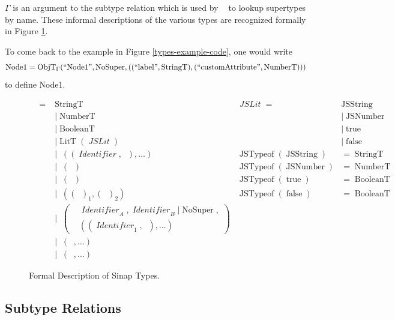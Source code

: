 \documentclass[12pt]{article}
\DeclareMathOperator{\StringT}{StringT}
\DeclareMathOperator{\NumberT}{NumberT}
\DeclareMathOperator{\BooleanT}{BooleanT}
\DeclareMathOperator{\LitT}{LitT}
\DeclareMathOperator{\JSLit}{\textit{JSLit}}
\DeclareMathOperator{\JSTypeof}{JSTypeof}
\DeclareMathOperator{\RecT}{RecT_\Gamma}
\DeclareMathOperator{\ObjT}{ObjT_\Gamma}
\DeclareMathOperator{\ListT}{ListT_\Gamma}
\DeclareMathOperator{\SetT}{SetT_\Gamma}
\DeclareMathOperator{\MapT}{MapT_\Gamma}
\DeclareMathOperator{\UnionT}{UnionT_\Gamma}
\DeclareMathOperator{\InterT}{InterT_\Gamma}
\DeclareMathOperator{\Identifier}{\textit{Identifier}}
\DeclareMathOperator{\Type}{{\textit{Type}_\Gamma}}
\DeclareMathOperator{\NoSuper}{NoSuper}
\DeclareMathOperator{\ObjectSubtype}{ObjectSubtype_\Gamma}
\begin{document}
\(\Gamma\) is an 
argument to the subtype relation which is used by \(\ObjectSubtype\) to 
lookup supertypes by name. These informal 
descriptions of the various types are recognized formally 
in Figure \ref{sinap-types-model}.

To come back to the example in Figure \ref{types-example-code}, 
one would write 
\[
    \operatorname{Node1} = \ObjT(``\text{Node1}", \NoSuper, (
        (``\text{label}", \StringT),
        (``\text{customAttribute}", \NumberT)
        ))
\]
to define Node1.

\linespread{1}
\begin{figure}
\begin{mdframed}
\begin{align*}
\Type = &\StringT   &\JSLit = &\operatorname{JSString} \\
&|\NumberT                 &&| \operatorname{JSNumber} \\
&|\BooleanT                &&| \operatorname{true} \\
&|\LitT(\JSLit)            &&| \operatorname{false} \\
&|\RecT((\Identifier, \Type), ...) & \JSTypeof(\operatorname{JSString}) &= \StringT \\
&|\ListT(\Type) & \JSTypeof(\operatorname{JSNumber}) &= \NumberT \\
&|\SetT(\Type) & \JSTypeof(\operatorname{true}) &= \BooleanT \\
&|\MapT((\Type)_1, (\Type)_2) & \JSTypeof(\operatorname{false}) &= \BooleanT \\
&|\ObjT\left(\begin{aligned}
    &\Identifier_A, \Identifier_B | \NoSuper, \\
&((\Identifier_1, \Type), ...)
\end{aligned}\right) \\
&|\InterT(\ObjT, ...) \\
&|\UnionT(\Type, ...)
\end{align*}
\end{mdframed}
\caption{Formal Description of Sinap Types.}
\label{sinap-types-model}
\end{figure}

\subsection{Subtype Relations}
\end{document}
